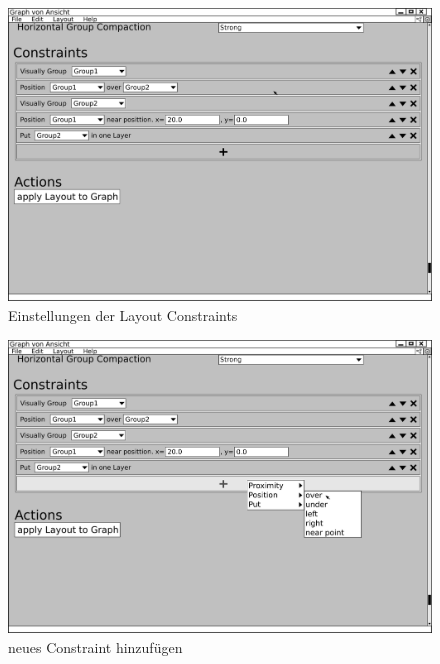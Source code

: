 \begin{figure}[ht]
  \centering
  \includegraphics[width=380pt]{resourcen/gui_layoutsettings_constraints.png}
  \caption{Einstellungen der Layout Constraints}
  \label{fig:gui_layoutsettings_constraints}
\end{figure}

\begin{figure}[ht]
  \centering
  \includegraphics[width=380pt]{resourcen/gui_layoutsettings_constraints_new.png}
  \caption{neues Constraint hinzufügen}
  \label{fig:gui_layoutsettings_constraints_new}
\end{figure}


